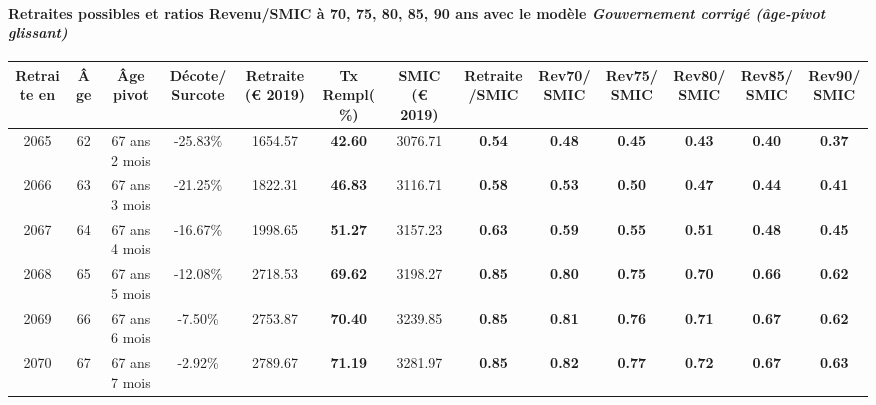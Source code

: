 \paragraph{Retraites possibles et ratios Revenu/SMIC à 70, 75, 80, 85, 90 ans avec le modèle \emph{Gouvernement corrigé (âge-pivot glissant)}}  
 
{ \scriptsize \begin{center} 
\begin{tabular}[htb]{|c|c||c|c||c|c||c||c|c|c|c|c|c|} 
\hline 
 Retraite en &  Âge &  Âge pivot &  Décote/Surcote &  Retraite (\euro{} 2019) &  Tx Rempl(\%) &  SMIC (\euro{} 2019) &  Retraite/SMIC &  Rev70/SMIC &  Rev75/SMIC &  Rev80/SMIC &  Rev85/SMIC &  Rev90/SMIC \\ 
\hline \hline 
 2065 &  62 &  67 ans 2 mois &  -25.83\% &  1654.57 &  {\bf 42.60} &  3076.71 &  {\bf {\color{red} 0.54}} &  {\bf {\color{red} 0.48}} &  {\bf {\color{red} 0.45}} &  {\bf {\color{red} 0.43}} &  {\bf {\color{red} 0.40}} &  {\bf {\color{red} 0.37}} \\ 
\hline 
 2066 &  63 &  67 ans 3 mois &  -21.25\% &  1822.31 &  {\bf 46.83} &  3116.71 &  {\bf {\color{red} 0.58}} &  {\bf {\color{red} 0.53}} &  {\bf {\color{red} 0.50}} &  {\bf {\color{red} 0.47}} &  {\bf {\color{red} 0.44}} &  {\bf {\color{red} 0.41}} \\ 
\hline 
 2067 &  64 &  67 ans 4 mois &  -16.67\% &  1998.65 &  {\bf 51.27} &  3157.23 &  {\bf {\color{red} 0.63}} &  {\bf {\color{red} 0.59}} &  {\bf {\color{red} 0.55}} &  {\bf {\color{red} 0.51}} &  {\bf {\color{red} 0.48}} &  {\bf {\color{red} 0.45}} \\ 
\hline 
 2068 &  65 &  67 ans 5 mois &  -12.08\% &  2718.53 &  {\bf 69.62} &  3198.27 &  {\bf {\color{red} 0.85}} &  {\bf {\color{red} 0.80}} &  {\bf {\color{red} 0.75}} &  {\bf {\color{red} 0.70}} &  {\bf {\color{red} 0.66}} &  {\bf {\color{red} 0.62}} \\ 
\hline 
 2069 &  66 &  67 ans 6 mois &  -7.50\% &  2753.87 &  {\bf 70.40} &  3239.85 &  {\bf {\color{red} 0.85}} &  {\bf {\color{red} 0.81}} &  {\bf {\color{red} 0.76}} &  {\bf {\color{red} 0.71}} &  {\bf {\color{red} 0.67}} &  {\bf {\color{red} 0.62}} \\ 
\hline 
 2070 &  67 &  67 ans 7 mois &  -2.92\% &  2789.67 &  {\bf 71.19} &  3281.97 &  {\bf {\color{red} 0.85}} &  {\bf {\color{red} 0.82}} &  {\bf {\color{red} 0.77}} &  {\bf {\color{red} 0.72}} &  {\bf {\color{red} 0.67}} &  {\bf {\color{red} 0.63}} \\ 
\hline 
\hline 
\end{tabular} 
\end{center} } 
